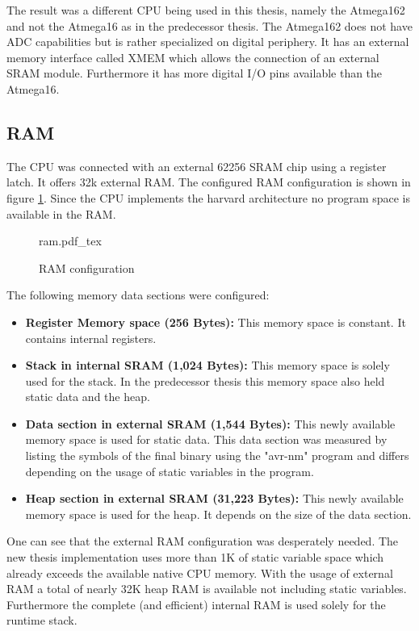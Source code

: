 The result was a different CPU being used in this thesis, namely the Atmega162 and not the Atmega16 as in the predecessor thesis. The Atmega162 does not have ADC capabilities but is rather specialized on digital periphery. It has an external memory interface called XMEM which allows the connection of an external SRAM module. Furthermore it has more digital I/O pins available than the Atmega16.

\subsection{RAM}%
The CPU was connected with an external 62256 SRAM \cite{62256-datasheet} chip using a register latch. It offers 32k external RAM. The configured RAM configuration is shown in figure \ref{fig:ram}. Since the CPU implements the harvard architecture no program space is available in the RAM.

\begin{figure}[H]
\centering
{ram.pdf_tex}
\caption{RAM configuration}
\label{fig:ram}
\end{figure}

The following memory data sections were configured:

\begin{itemize}
    \item \textbf{Register Memory space (256 Bytes):} This memory space is constant. It contains internal registers.
    \item \textbf{Stack in internal SRAM (1,024 Bytes):} This memory space is solely used for the stack. In the predecessor thesis \cite{korniowski} this memory space also held static data and the heap.
    \item \textbf{Data section in external SRAM (1,544 Bytes):} This newly available memory space is used for static data. This data section was measured by listing the symbols of the final binary using the "avr-nm" program and differs depending on the usage of static variables in the program.
    \item \textbf{Heap section in external SRAM (31,223 Bytes):} This newly available memory space is used for the heap. It depends on the size of the data section.
\end{itemize}

One can see that the external RAM configuration was desperately needed. The new thesis implementation uses more than 1K of static variable space which already exceeds the available native CPU memory. With the usage of external RAM a total of nearly 32K heap RAM is available not including static variables. Furthermore the complete (and efficient) internal RAM is used solely for the runtime stack.

